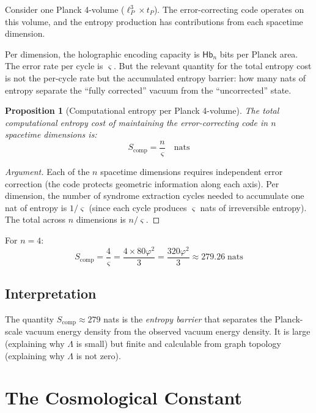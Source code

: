 \documentclass[11pt,a4paper]{article}
\newtheorem{proposition}[theorem]{Proposition}
\theoremstyle{definition}
\newcommand{\Hb}{\mathsf{Hb}}
\newcommand{\Hbn}{\Hb_n}
\newcommand{\gs}{\varsigma}                %
\begin{document}
Consider one Planck 4-volume ($\ell_P^3 \times t_P$). The error-correcting code operates on this volume, and the entropy production has contributions from each spacetime dimension.

Per dimension, the holographic encoding capacity is $\Hbn$ bits per Planck area. The error rate per cycle is $\gs$. But the relevant quantity for the total entropy cost is not the per-cycle rate but the accumulated entropy barrier: how many nats of entropy separate the ``fully corrected'' vacuum from the ``uncorrected'' state.

\begin{proposition}[Computational entropy per Planck 4-volume]\label{prop:entropy}
The total computational entropy cost of maintaining the error-correcting code in $n$ spacetime dimensions is:
\begin{equation}\label{eq:Scomp}
    S_{\text{comp}} = \frac{n}{\gs} \quad \text{nats}
\end{equation}
\end{proposition}

\begin{proof}[Argument]
Each of the $n$ spacetime dimensions requires independent error correction (the code protects geometric information along each axis). Per dimension, the number of syndrome extraction cycles needed to accumulate one nat of entropy is $1/\gs$ (since each cycle produces $\gs$ nats of irreversible entropy). The total across $n$ dimensions is $n/\gs$.
\end{proof}

For $n = 4$:
\begin{equation}
    S_{\text{comp}} = \frac{4}{\gs} = \frac{4 \times 80\varphi^2}{3} 
    = \frac{320\varphi^2}{3} \approx 279.26 \;\text{nats}
\end{equation}

\subsection{Interpretation}

The quantity $S_{\text{comp}} \approx 279$ nats is the \emph{entropy barrier} that separates the Planck-scale vacuum energy density from the observed vacuum energy density. It is large (explaining why $\Lambda$ is small) but finite and calculable from graph topology (explaining why $\Lambda$ is not zero).


\section{The Cosmological Constant}
\end{document}

